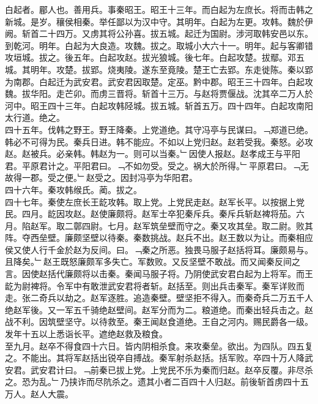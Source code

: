 \documentclass{zhvt-classic}
\begin{document}

\hspace*{2em}白起者。郿人也。善用兵。事秦昭王。昭王十三年。而白起为左庶长。将而击韩之新城。是岁。穰侯相秦。举任鄙以为汉中守。其明年。白起为左更。攻韩。魏於伊阙。斩首二十四万。又虏其将公孙喜。拔五城。起迁为国尉。涉河取韩安邑以东。到乾河。明年。白起为大良造。攻魏。拔之。取城小大六十一。明年。起与客卿错攻垣城。拔之。後五年。白起攻赵。拔光狼城。後七年。白起攻楚。拔鄢。邓五城。其明年。攻楚。拔郢。烧夷陵。遂东至竟陵。楚王亡去郢。东走徙陈。秦以郢为南郡。白起迁为武安君。武安君因取楚。定巫。黔中郡。昭王三十四年。白起攻魏。拔华阳。走芒卯。而虏三晋将。斩首十三万。与赵将贾偃战。沈其卒二万人於河中。昭王四十三年。白起攻韩陉城。拔五城。斩首五万。四十四年。白起攻南阳太行道。绝之。\\
\hspace*{2em}四十五年。伐韩之野王。野王降秦。上党道绝。其守冯亭与民谋曰。﹁郑道已绝。韩必不可得为民。秦兵日进。韩不能应。不如以上党归赵。赵若受我。秦怒。必攻赵。赵被兵。必亲韩。韩赵为一。则可以当秦。﹂因使人报赵。赵孝成王与平阳君。平原君计之。平阳君曰。﹁不如勿受。受之。祸大於所得。﹂平原君曰。﹁无故得一郡。受之便。﹂赵受之。因封冯亭为华阳君。\\
\hspace*{2em}四十六年。秦攻韩缑氏。蔺。拔之。\\
\hspace*{2em}四十七年。秦使左庶长王龁攻韩。取上党。上党民走赵。赵军长平。以按据上党民。四月。龁因攻赵。赵使廉颇将。赵军士卒犯秦斥兵。秦斥兵斩赵裨将茄。六月。陷赵军。取二鄣四尉。七月。赵军筑垒壁而守之。秦又攻其垒。取二尉。败其阵。夺西垒壁。廉颇坚壁以待秦。秦数挑战。赵兵不出。赵王数以为让。而秦相应侯又使人行千金於赵为反间。曰。﹁秦之所恶。独畏马服子赵括将耳。廉颇易与。且降矣。﹂赵王既怒廉颇军多失亡。军数败。又反坚壁不敢战。而又闻秦反间之言。因使赵括代廉颇将以击秦。秦闻马服子将。乃阴使武安君白起为上将军。而王龁为尉裨将。令军中有敢泄武安君将者斩。赵括至。则出兵击秦军。秦军详败而走。张二奇兵以劫之。赵军逐胜。追造秦壁。壁坚拒不得入。而秦奇兵二万五千人绝赵军後。又一军五千骑绝赵壁间。赵军分而为二。粮道绝。而秦出轻兵击之。赵战不利。因筑壁坚守。以待救至。秦王闻赵食道绝。王自之河内。赐民爵各一级。发年十五以上悉诣长平。遮绝赵救及粮食。\\
\hspace*{2em}至九月。赵卒不得食四十六日。皆内阴相杀食。来攻秦垒。欲出。为四队。四五复之。不能出。其将军赵括出锐卒自搏战。秦军射杀赵括。括军败。卒四十万人降武安君。武安君计曰。﹁前秦已拔上党。上党民不乐为秦而归赵。赵卒反覆。非尽杀之。恐为乱。﹂乃挟诈而尽阬杀之。遗其小者二百四十人归赵。前後斩首虏四十五万人。赵人大震。\\
\end{document}
